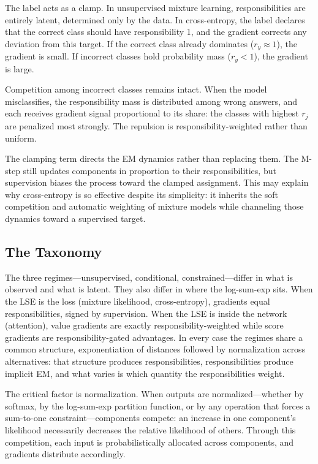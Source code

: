 The label acts as a clamp. In unsupervised mixture learning, responsibilities are entirely latent, determined only by the data. In cross-entropy, the label declares that the correct class should have responsibility 1, and the gradient corrects any deviation from this target. If the correct class already dominates ($r_y \approx 1$), the gradient is small. If incorrect classes hold probability mass ($r_y < 1$), the gradient is large.

Competition among incorrect classes remains intact. When the model misclassifies, the responsibility mass is distributed among wrong answers, and each receives gradient signal proportional to its share: the classes with highest $r_j$ are penalized most strongly. The repulsion is responsibility-weighted rather than uniform.

The clamping term directs the EM dynamics rather than replacing them. The M-step still updates components in proportion to their responsibilities, but supervision biases the process toward the clamped assignment. This may explain why cross-entropy is so effective despite its simplicity: it inherits the soft competition and automatic weighting of mixture models while channeling those dynamics toward a supervised target.

\subsection{The Taxonomy}

The three regimes---unsupervised, conditional, constrained---differ in what is observed and what is latent. They also differ in where the log-sum-exp sits. When the LSE is the loss (mixture likelihood, cross-entropy), gradients equal responsibilities, signed by supervision. When the LSE is inside the network (attention), value gradients are exactly responsibility-weighted while score gradients are responsibility-gated advantages. In every case the regimes share a common structure, exponentiation of distances followed by normalization across alternatives: that structure produces responsibilities, responsibilities produce implicit EM, and what varies is which quantity the responsibilities weight.

The critical factor is normalization. When outputs are normalized---whether by softmax, by the log-sum-exp partition function, or by any operation that forces a sum-to-one constraint---components compete: an increase in one component's likelihood necessarily decreases the relative likelihood of others. Through this competition, each input is probabilistically allocated across components, and gradients distribute accordingly.

